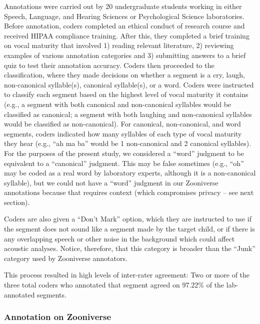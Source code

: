 \documentclass[english,,man,floatsintext]{apa6}
\begin{document}
Annotations were carried out by 20 undergraduate students working in either Speech, Language, and Hearing Sciences or Psychological Science laboratories. Before annotation, coders completed an ethical conduct of research course and received HIPAA compliance training. After this, they completed a brief training on vocal maturity that involved 1) reading relevant literature, 2) reviewing examples of various annotation categories and 3) submitting answers to a brief quiz to test their annotation accuracy. Coders then proceeded to the classification, where they made decisions on whether a segment is a cry, laugh, non-canonical syllable(s), canonical syllable(s), or a word. Coders were instructed to classify each segment based on the highest level of vocal maturity it contains (e.g., a segment with both canonical and non-canonical syllables would be classified as canonical; a segment with both laughing and non-canonical syllables would be classified as non-canonical). For canonical, non-canonical, and word segments, coders indicated how many syllables of each type of vocal maturity they hear (e.g., \enquote{ah ma ba} would be 1 non-canonical and 2 canonical syllables). For the purposes of the present study, we considered a \enquote{word} judgment to be equivalent to a \enquote{canonical} judgment. This may be false sometimes (e.g., \enquote{oh} may be coded as a real word by laboratory experts, although it is a non-canonical syllable), but we could not have a \enquote{word} judgment in our Zooniverse annotations because that requires context (which compromises privacy -- see next section).

Coders are also given a \enquote{Don't Mark} option, which they are instructed to use if the segment does not sound like a segment made by the target child, or if there is any overlapping speech or other noise in the background which could affect acoustic analyses. Notice, therefore, that this category is broader than the \enquote{Junk} category used by Zooniverse annotators.

This process resulted in high levels of inter-rater agreement: Two or more of the three total coders who annotated that segment agreed on 97.22\% of the lab-annotated segments.

\hypertarget{annotation-on-zooniverse}{%
\subsubsection{Annotation on Zooniverse}\label{annotation-on-zooniverse}}
\end{document}
